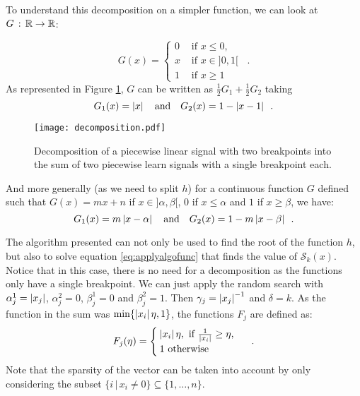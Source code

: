 To understand this decomposition on a simpler function, we can look at $G\,:\,\mathbb{R}\rightarrow\mathbb{R}$:

\[G(x)=\begin{cases} 0& \text{ if }x\leq 0,\\
                    x & \text{ if }x\in]0,1[\\
                    1 & \text{ if }x\geq 1\end{cases}\enspace.\]
As represented in Figure \ref{fig:decomposition}, $G$ can be written as $\frac{1}{2}G_1 + \frac{1}{2}G_2$ taking
\[G_1(x)=\left|x\right| \quad\text{and}\quad G_2(x)=1-\left|x-1\right|\enspace.\]
\begin{figure}[H]
    \centering
    \texttt{[image: decomposition.pdf]}
    \caption{Decomposition of a piecewise linear signal with two breakpoints into the sum of two piecewise learn signals with a single breakpoint each.}
    \label{fig:decomposition}
\end{figure}

And more generally (as we need to split $h$) for a continuous function $G$ defined such that $G(x)= mx + n$ if $x\in ]\alpha, \beta[$, $0$ if $x\leq \alpha$ and $1$ if $x\geq\beta$, we have:
\[G_1(x)=m\left|x-\alpha\right| \quad\text{and}\quad G_2(x)=1-m\left|x-\beta\right|\enspace.\]

\begin{remark}
The algorithm presented can not only be used to find the root of the function $h$, but also to solve equation \eqref{eq:applyalgofunc} that finds the value of $\mathcal{S}_k(x)$. Notice that in this case, there is no need for a decomposition as the functions only have a single breakpoint. We can just apply the random search with $\alpha_j^1=\left|x_j\right|$, $\alpha_j^2=0$, $\beta_j^1=0$ and $\beta_j^2=1$. Then $\gamma_j=\left|x_j\right|^{-1}$ and $\delta=k$. As the function in the sum was $\min\{\left|x_i\right|\eta,1\}$, the functions $F_j$ are defined as:
\[F_j(\eta)=\begin{cases}\left|x_i\right|\eta,\text{ if }\frac{1}{\left|x_i\right|}\geq \eta, \\ 1 \text{ otherwise}\end{cases}\enspace.\]
Note that the sparsity of the vector can be taken into account by only considering the subset $\{i\,|\, x_i\neq 0\}\subseteq \{1,\dots,n\}.$
\end{remark}

